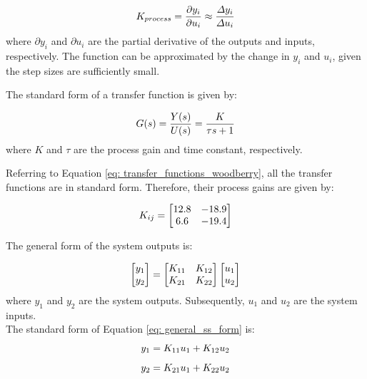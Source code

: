 \begin{equation}
    \centering
    K_{process} = \frac{\partial y_i}{\partial u_i} \approx \frac{\varDelta y_i}{\varDelta u_i}
    \label{eq: process_gain}
\end{equation}
where $\partial y_i$ and $\partial u_i$ are the partial derivative of the outputs and inputs, respectively. The function can be approximated by the change in $y_i$ and $u_i$, given the step sizes are sufficiently small.

The standard form of a transfer function is given by:

\begin{equation}
    \centering
    G(s) = \frac{Y(s)}{U(s)} = \frac{K}{\tau s + 1}
\end{equation}
where $K$ and $\tau$ are the process gain and time constant, respectively.

Referring to Equation \ref{eq: transfer_functions_woodberry}, all the transfer functions are in standard form.  Therefore, their process gains are given by:

\begin{equation}
    \centering
    K_{ij} =
    \begin{bmatrix}
    12.8     &     -18.9 \\
    6.6      &     -19.4 
    \end{bmatrix}
    \label{eq: process_gains}
\end{equation}

The general form of the system outputs is:

\begin{equation}
    \centering
    \begin{bmatrix}
        y_1 \\
        y_2
    \end{bmatrix}
    =
    \begin{bmatrix}
        K_{11}  &  K_{12} \\
        K_{21}  &  K_{22}
    \end{bmatrix}
    \begin{bmatrix}
        u_1 \\
        u_2
    \end{bmatrix}
    \label{eq: general_ss_form}
\end{equation}
where $y_1$ and $y_2$ are the system outputs.  Subsequently, $u_1$ and $u_2$ are the system inputs. \\

The standard form of Equation \ref{eq: general_ss_form} is:
{
\begin{equation}
    \centering
    y_1 = K_{11}u_1 + K_{12}u_2
    \label{eq: y1_iol}
\end{equation}
\begin{equation}
    \centering
    y_2 = K_{21}u_1 + K_{22}u_2
    \label{eq: y2_iol}
\end{equation}}

